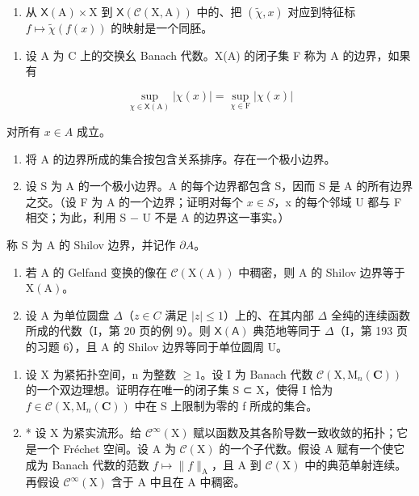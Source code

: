 \begin{enumerate}
\def\labelenumi{\alph{enumi})}
\setcounter{enumi}{4}
\tightlist
\item
  从 \(\mathsf{X}(\mathrm{A})\times \mathrm{X}\) 到 \(\mathsf{X}(\mathcal{C}(\mathrm{X},\mathrm{A}))\) 中的、把 \((\widetilde{\chi},x)\) 对应到特征标 \(f\mapsto \widetilde{\chi} (f(x))\) 的映射是一个同胚。
\end{enumerate}

\begin{enumerate}
\def\labelenumi{\arabic{enumi})}
\setcounter{enumi}{26}
\tightlist
\item
  设 A 为 C 上的交换幺 Banach 代数。X(A) 的闭子集 F 称为 A 的边界，如果有
\end{enumerate}

\[
\sup _ {\chi \in \mathsf {X} (\mathrm{A})} | \chi (x) | = \sup _ {\chi \in \mathrm{F}} | \chi (x) |
\]

对所有 \(x \in A\) 成立。

\begin{enumerate}
\def\labelenumi{\alph{enumi})}
\item
  将 A 的边界所成的集合按包含关系排序。存在一个极小边界。
\item
  设 S 为 A 的一个极小边界。A 的每个边界都包含 S，因而 S 是 A 的所有边界之交。（设 F 为 A 的一个边界；证明对每个 \(x \in S\)，x 的每个邻域 U 都与 F 相交；为此，利用 S − U 不是 A 的边界这一事实。）
\end{enumerate}

称 S 为 A 的 Shilov 边界，并记作 \(\partial A\)。

\begin{enumerate}
\def\labelenumi{\alph{enumi})}
\setcounter{enumi}{2}
\item
  若 A 的 Gelfand 变换的像在 \(\mathcal{C}(\mathrm{X}(\mathrm{A}))\) 中稠密，则 A 的 Shilov 边界等于 \(\mathrm{X}(\mathrm{A})\)。
\item
  设 A 为单位圆盘 \(\Delta\)（\(z \in C\) 满足 \(|z| \leqslant 1\)）上的、在其内部 \(\Delta\) 全纯的连续函数所成的代数（I，第 20 页的例 9）。则 \(\mathsf{X}(\mathsf{A})\) 典范地等同于 \(\Delta\)（I，第 193 页的习题 6），且 A 的 Shilov 边界等同于单位圆周 U。
\end{enumerate}

\begin{enumerate}
\def\labelenumi{\arabic{enumi})}
\setcounter{enumi}{27}
\item
  设 X 为紧拓扑空间，n 为整数 \(\geqslant 1\)。设 I 为 Banach 代数 \(\mathcal{C}(\mathrm{X},\mathrm{M}_{n}(\mathbf{C}))\) 的一个双边理想。证明存在唯一的闭子集 S ⊂ X，使得 I 恰为 \(f \in \mathcal{C}(\mathrm{X}, \mathrm{M}_{n}(\mathbf{C}))\) 中在 S 上限制为零的 f 所成的集合。
\item
  * 设 X 为紧实流形。给 \(\mathcal{C}^{\infty}(\mathrm{X})\) 赋以函数及其各阶导数一致收敛的拓扑；它是一个 Fréchet 空间。设 A 为 \(\mathcal{C}(\mathrm{X})\) 的一个子代数。假设 A 赋有一个使它成为 Banach 代数的范数 \(f \mapsto \| f\|_{\mathrm{A}}\)，且 A 到 \(\mathcal{C}(\mathrm{X})\) 中的典范单射连续。再假设 \(\mathcal{C}^{\infty}(\mathrm{X})\) 含于 A 中且在 A 中稠密。
\end{enumerate}

